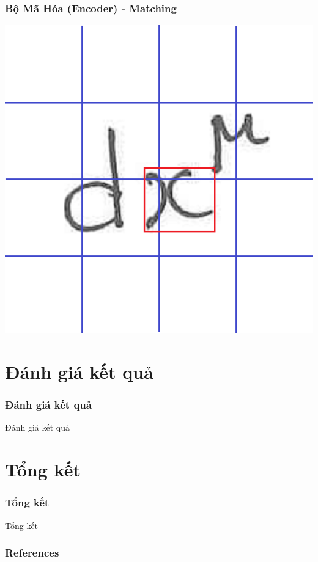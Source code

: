 \documentclass{beamer}
\begin{document}
\begin{frame}
	\frametitle{Bộ Mã Hóa (Encoder) - Matching}
	

	\begin{center}
		\centering
		\includegraphics[width=0.6\linewidth]{GT.png}
	\end{center}

\end{frame}


\section{Đánh giá kết quả}
\begin{frame}
	\frametitle{Đánh giá kết quả}
	{\Huge Đánh giá kết quả}
\end{frame}

\section{Tổng kết}
\begin{frame}
	\frametitle{Tổng kết}
	{\Huge Tổng kết}
\end{frame}

\begin{frame}
	\frametitle{References}
	\newpage
	
	
\end{frame}



\begin{frame}
\Huge{}
\end{frame}

\end{document}
